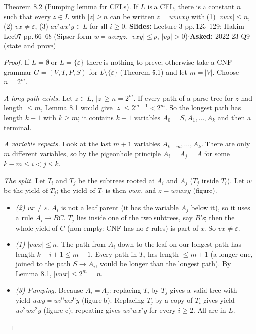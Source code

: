 \documentclass[10.5pt,a4paper]{article}
\newcommand{\src}[2]{{\footnotesize\color{gray!70!black}\textbf{Slides:} #1\enspace$\cdot$\enspace\textbf{Asked:} #2}\par}
\newcommand{\eps}{\varepsilon}
\begin{document}
\begin{thm}{Theorem 8.2 (Pumping lemma for CFLs). If $L$ is a CFL, there is a constant $n$ such that every $z\in L$ with $|z|\ge n$ can be
written $z=uvwxy$ with (1) $|vwx|\le n$, (2) $vx\ne\eps$, (3) $uv^iwx^iy\in L$ for all $i\ge0$.}
\src{Lecture 3 pp.\,123--129; Hakim Lec07 pp.\,66--68 (Sipser form $w=uvxyz$, $|vxy|\le p$, $|vy|>0$)}{2022-23 Q9 (state and prove)}\end{thm}
\begin{proof}
If $L=\emptyset$ or $L=\{\eps\}$ there is nothing to prove; otherwise take a CNF grammar $G=(V,T,P,S)$ for $L\setminus\{\eps\}$ (Theorem
6.1) and let $m=|V|$. Choose $n=2^m$.

\emph{A long path exists.} Let $z\in L$, $|z|\ge n=2^m$. If every path of a parse tree for $z$ had length $\le m$, Lemma 8.1 would give
$|z|\le2^{m-1}<2^m$. So the longest path has length $k+1$ with $k\ge m$; it contains $k+1$ variables $A_0=S,A_1,\dots,A_k$ and then a terminal.

\emph{A variable repeats.} Look at the last $m+1$ variables $A_{k-m},\dots,A_k$. There are only $m$ different variables, so by the pigeonhole
principle $A_i=A_j=A$ for some $k-m\le i<j\le k$.

\emph{The split.} Let $T_i$ and $T_j$ be the subtrees rooted at $A_i$ and $A_j$ ($T_j$ inside $T_i$). Let $w$ be the yield of $T_j$; the yield
of $T_i$ is then $vwx$, and $z=uvwxy$ (figure).
\begin{itemize}
\item \emph{(2) $vx\ne\eps$.} $A_i$ is not a leaf parent (it has the variable $A_j$ below it), so it uses a rule $A_i\to BC$. $T_j$ lies inside
one of the two subtrees, say $B$'s; then the whole yield of $C$ (non-empty: CNF has no $\eps$-rules) is part of $x$. So $vx\ne\eps$.
\item \emph{(1) $|vwx|\le n$.} The path from $A_i$ down to the leaf on our longest path has length $k-i+1\le m+1$. Every path in $T_i$ has length
$\le m+1$ (a longer one, joined to the path $S\to A_i$, would be longer than the longest path). By Lemma 8.1, $|vwx|\le2^{m}=n$.
\item \emph{(3) Pumping.} Because $A_i=A_j$: replacing $T_i$ by $T_j$ gives a valid tree with yield $uwy=uv^0wx^0y$ (figure b). Replacing
$T_j$ by a copy of $T_i$ gives yield $uv^2wx^2y$ (figure c); repeating gives $uv^iwx^iy$ for every $i\ge2$. All are in $L$.
\end{itemize}
\vspace{-6pt}
\end{proof}
\end{document}
